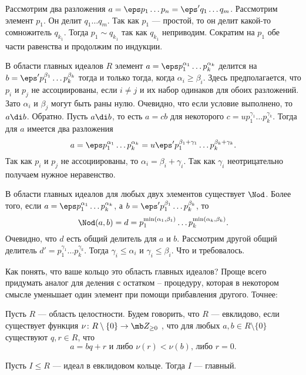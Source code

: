 \proof[Единственность] Рассмотрим два разложения $a=\eps p_1\dots p_n=\eps' q_1\dots q_m$. Рассмотрим элемент $p_1$. Он делит $q_1\dots q_m$. Так как $p_1$ --- простой, то он делит какой-то сомножитель $q_{k_1}$. Тогда $p_1\sim q_{k_1}$ так как $q_{k_1}$ неприводим. Сократим на $p_1$ обе части равенства и продолжим по индукции.
\endproof

\lm В области главных идеалов $R$ элемент $a=\eps p_1^{\alpha_1}\dots p_k^{\alpha_k}$ делится на $b=\eps' p_1^{\beta_1}\dots p_k^{\beta_k}$ тогда и только тогда, когда $\alpha_i\geq \beta_i$. Здесь предполагается, что $p_i$ и $p_j$ не ассоциированы, если $i\neq j$  и их набор одинаков для обоих разложений. Зато $\alpha_i$ и $\beta_j$ могут быть раны нулю.
\proof Очевидно, что если условие выполнено, то $a\di b$. Обратно. Пусть $a\di b$, то есть $a=cb$ для некоторого $c=up_1^{\gamma_1}\dots p_k^{\gamma_k}$. Тогда для $a$ имеется два разложения
$$a=\eps p_1^{\alpha_1}\dots p_k^{\alpha_k}=u\eps'p_1^{\beta_1+\gamma_1}\dots p_k^{\beta_k+\gamma_k}.$$
Так как $p_i$ и $p_j$ не ассоциированы, то $\alpha_i=\beta_i+\gamma_i$. Так как $\gamma_i$ неотрицательно получаем нужное неравенство.
\endproof
\elm



\lm В области главных идеалов для любых двух элементов существует $\Nod$. Более того, если $a=\eps p_1^{\alpha_1}\dots p_k^{\alpha_k}$, а $b=\eps' p_1^{\beta_1}\dots p_k^{\beta_k}$, то $$\Nod(a,b)=d=p_1^{\min(\alpha_1,\beta_1)}\dots p_k^{\min(\alpha_k,\beta_k)}.$$
\proof
Очевидно, что $d$ есть общий делитель для $a$ и $b$. Рассмотрим другой общий делитель $d'=p_1^{\gamma_1}\dots p_k^{\gamma_k}$. Тогда $\gamma_i\leq \alpha_i$ и $\gamma_i\leq \beta_i$. Что и требовалось.
\endproof
\elm







Как понять, что ваше кольцо это область главных идеалов? Проще всего придумать аналог для деления с остатком -- процедуру, которая в некотором смысле уменьшает один элемент при помощи прибавления другого. Точнее:

 Пусть $R$ --- область целостности. Будем говорить, что $R$ --- евклидово, если существует функция $\nu \colon R\setminus \{0 \}\to \mb Z_{\geq 0}$ , что для любых $a,b \in R\setminus \{0\}$ существуют $q,r\in R$, что
$$a=bq+r \text{ и либо $\nu(r)<\nu(b)$, либо } r=0.$$
\edfn



 Пусть $I\leq R$ --- идеал в евклидовом кольце. Тогда $I$ --- главный.
\ethrm

